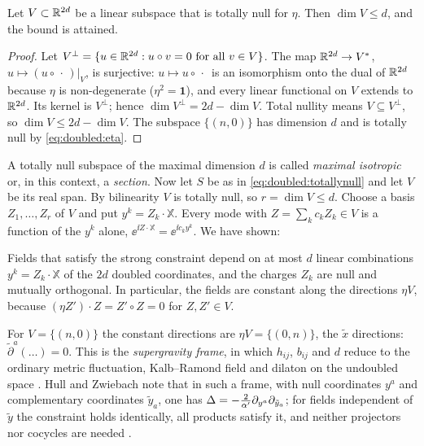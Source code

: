 \begin{proposition}\label{thm:doubled:dimbound}
Let $V\subset\mathbb{R}^{2d}$ be a linear subspace that is totally null for $\eta$. Then
$\dim V\le d$, and the bound is attained.
\end{proposition}
\begin{proof}
Let $V^\perp=\{u\in\mathbb{R}^{2d}:u\circ v=0\text{ for all }v\in V\}$. The map
$\mathbb{R}^{2d}\to V^*$, $u\mapsto(u\circ\,\cdot\,)|_V$, is surjective: $u\mapsto u\circ\,\cdot\,$ is an isomorphism
onto the dual of $\mathbb{R}^{2d}$ because $\eta$ is non-degenerate ($\eta^2=\mathbf 1$), and every linear
functional on $V$ extends to $\mathbb{R}^{2d}$. Its kernel is $V^\perp$; hence $\dim V^\perp=
2d-\dim V$. Total nullity means $V\subseteq V^\perp$, so $\dim V\le2d-\dim V$. The subspace
$\{(n,0)\}$ has dimension $d$ and is totally null by \eqref{eq:doubled:eta}.
\end{proof}

A totally null subspace of the maximal dimension $d$ is called \emph{maximal isotropic}
 or, in this context, a \emph{section}. Now
let $S$ be as in \eqref{eq:doubled:totallynull} and let $V$ be its real span. By bilinearity
$V$ is totally null, so $r=\dim V\le d$. Choose a basis $Z_1,\dots,Z_r$ of $V$ and put
$y^k=Z_k\cdot\mathbb X$. Every mode with $Z=\sum_kc_kZ_k\in V$ is a function of the $y^k$ alone,
$\ee^{\ii Z\cdot\mathbb X}=\ee^{\ii c_ky^k}$. We have shown:

\begin{corollary}\label{thm:doubled:half}
Fields that satisfy the strong constraint depend on at most $d$ linear combinations
$y^k=Z_k\cdot\mathbb X$ of the $2d$ doubled coordinates, and the charges $Z_k$ are null and
mutually orthogonal. In particular, the fields are constant along the directions $\eta V$,
because $(\eta Z')\cdot Z=Z'\circ Z=0$ for $Z,Z'\in V$.
\end{corollary}

For $V=\{(n,0)\}$ the constant directions are $\eta V=\{(0,n)\}$, the $\tilde x$ directions:
$\tilde\partial^a(\dots)=0$. This is the \emph{supergravity frame}, in
which $h_{ij}$, $b_{ij}$ and $d$ reduce to the ordinary metric fluctuation, Kalb--Ramond field
and dilaton on the undoubled space .
Hull and Zwiebach note that in such a frame, with null coordinates $y^a$ and complementary
coordinates $\tilde y_a$, one has $\Delta=-\frac2{\alpha'}\partial_{y^a}\partial_{\tilde y_a}$; for
fields independent of $\tilde y$ the constraint holds identically, all products satisfy it, and
neither projectors nor cocycles are needed .

